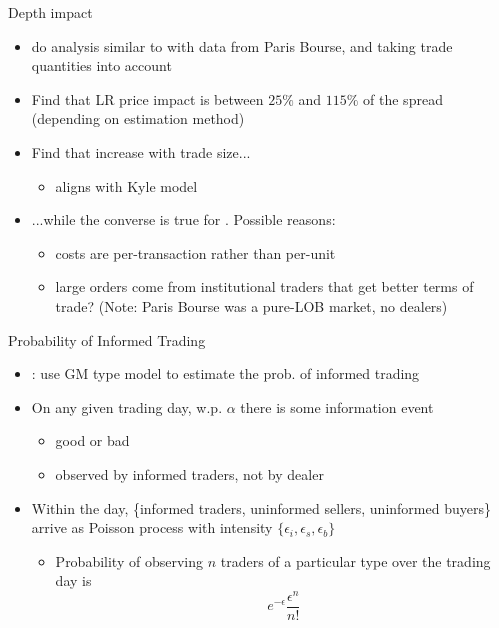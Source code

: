 \documentclass[english,10pt
,aspectratio=169
]{beamer}
\begin{document}
\begin{frame}{Depth impact}
	\begin{itemize}
		\item \textbf{\cite*{de_jong_price_1996}} do analysis similar to \cite{hasbrouck_measuring_1991} with data from Paris Bourse, and taking trade quantities into account
		\item Find that LR price impact is between $25\%$ and $115\%$ of the spread (depending on estimation method)
		\item Find that  \alert{increase with trade size}...
		\begin{itemize}
			\item aligns with Kyle model
		\end{itemize}
		\item ...while the \alert{converse} is true for . Possible reasons:
		\begin{itemize}
			\item costs are per-transaction rather than per-unit
			\item large orders come from institutional traders that get better terms of trade? (Note: Paris Bourse was a pure-LOB market, no dealers)
		\end{itemize}
	\end{itemize}
\end{frame}


\begin{frame}{Probability of Informed Trading}
	\begin{itemize}
		\item \textbf{\citet*{easley_liquidity_1996}}: use GM type model to estimate the prob. of informed trading
		\item On any given trading day, w.p. $\alpha$ there is some information event
		\begin{itemize}
			\item good or bad
			\item observed by informed traders, not by dealer
		\end{itemize}
		\item Within the day, \{informed traders, uninformed sellers, uninformed buyers\} arrive as Poisson process with intensity $\{\epsilon_i, \epsilon_s, \epsilon_b \}$
		\begin{itemize}
			\item Probability of observing $n$ traders of a particular type over the trading day is
			\[
			e^{-\epsilon} \frac{\epsilon^n}{n!}
			\]
		\end{itemize}
	\end{itemize}
\end{frame}
\end{document}
